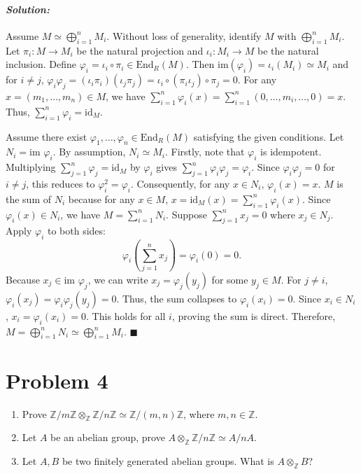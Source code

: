 \documentclass[12pt, a4paper]{article}
\newenvironment{solution}
  {\paragraph{\textit{Solution:}}\par\medskip}
  {\hfill$\blacksquare$\vspace{0.1cm}}
\begin{document}
\begin{solution}
    Assume $M \simeq \bigoplus_{i=1}^n M_i$. Without loss of generality, identify $M$ with $\bigoplus_{i=1}^n M_i$.
    Let $\pi_i: M \to M_i$ be the natural projection and $\iota_i: M_i \to M$ be the natural inclusion. 
    Define $\varphi_i = \iota_i \circ \pi_i \in \text{End}_R(M)$. Then $\text{im} (\varphi_i) = \iota_i(M_i) \simeq M_i$
    and for $i \neq j$, $\varphi_i \varphi_j = (\iota_i \pi_i)(\iota_j \pi_j) = \iota_i \circ (\pi_i \iota_j) \circ \pi_j = 0$.
    For any $x = (m_1, \dots, m_n) \in M$, we have $\sum_{i=1}^n \varphi_i(x) = \sum_{i=1}^n (0, \dots, m_i, \dots, 0) = x$. Thus, $\sum_{i=1}^n \varphi_i = \text{id}_M$.
    
    Assume there exist $\varphi_1, \dots, \varphi_n \in \text{End}_R(M)$ satisfying the given conditions. Let $N_i = \text{im } \varphi_i$. By assumption, $N_i \simeq M_i$.
    Firstly, note that $\varphi_i$ is idempotent. Multiplying $\sum_{j=1}^n \varphi_j = \text{id}_M$ by $\varphi_i$ gives $\sum_{j=1}^n \varphi_i \varphi_j = \varphi_i$. Since $\varphi_i \varphi_j = 0$ for $i \neq j$, this reduces to $\varphi_i^2 = \varphi_i$. 
    Consequently, for any $x \in N_i$, $\varphi_i(x) = x$. $M$ is the sum of $N_i$ because for any $x \in M$, $x = \text{id}_M(x) = \sum_{i=1}^n \varphi_i(x)$. Since $\varphi_i(x) \in N_i$, we have $M = \sum_{i=1}^n N_i$.
    Suppose $\sum_{j=1}^n x_j = 0$ where $x_j \in N_j$. Apply $\varphi_i$ to both sides:
    $$\varphi_i \left( \sum_{j=1}^n x_j \right) = \varphi_i(0) = 0.$$
    Because $x_j \in \text{im } \varphi_j$, we can write $x_j = \varphi_j(y_j)$ for some $y_j \in M$. 
    For $j \neq i$, $\varphi_i(x_j) = \varphi_i \varphi_j(y_j) = 0$. 
    Thus, the sum collapses to $\varphi_i(x_i) = 0$. Since $x_i \in N_i$, $x_i = \varphi_i(x_i) = 0$. 
    This holds for all $i$, proving the sum is direct. Therefore, $M = \bigoplus_{i=1}^n N_i \simeq \bigoplus_{i=1}^n M_i$. 
\end{solution}

\section*{Problem 4}
\begin{enumerate}
    \item Prove $\mathbb{Z}/m\mathbb{Z} \otimes_{\mathbb{Z}} \mathbb{Z}/n\mathbb{Z} \simeq \mathbb{Z}/(m,n)\mathbb{Z}$, where $m, n \in \mathbb{Z}$.
    \item Let $A$ be an abelian group, prove $A \otimes_{\mathbb{Z}} \mathbb{Z}/n\mathbb{Z} \simeq A/nA$.
    \item Let $A, B$ be two finitely generated abelian groups. What is $A \otimes_{\mathbb{Z}} B$?
\end{enumerate}
\end{document}
